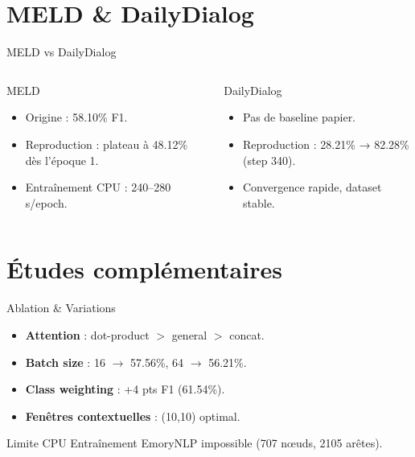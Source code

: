 \documentclass[10pt,aspectratio=169]{beamer}
\begin{document}
\section{MELD \& DailyDialog}
\begin{frame}{MELD vs DailyDialog}
  \begin{columns}
    \begin{block}{MELD}
      \begin{itemize}
        \item Origine : 58.10\% F1.
        \item Reproduction : plateau à 48.12\% dès l’époque 1.
        \item Entraînement CPU : 240–280 s/epoch.
      \end{itemize}
    \end{block}
    \begin{block}{DailyDialog}
      \begin{itemize}
        \item Pas de baseline papier.
        \item Reproduction : 28.21\% → 82.28\% (step 340).
        \item Convergence rapide, dataset stable.
      \end{itemize}
    \end{block}
  \end{columns}
\end{frame}

\section{Études complémentaires}
\begin{frame}{Ablation \& Variations}
  \begin{itemize}
    \item \textbf{Attention} : dot-product $>$ general $>$ concat.
    \item \textbf{Batch size} : 16 $\rightarrow$ 57.56\%, 64 $\rightarrow$ 56.21\%.
    \item \textbf{Class weighting} : +4 pts F1 (61.54\%).
    \item \textbf{Fenêtres contextuelles} : (10,10) optimal.
  \end{itemize}
  \vfill
  \begin{block}{Limite CPU}
    Entraînement EmoryNLP impossible (707 nœuds, 2105 arêtes).
  \end{block}
\end{frame}
\end{document}
